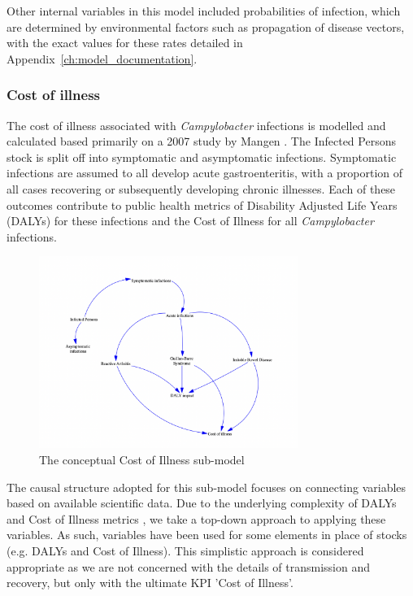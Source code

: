 Other internal variables in this model included probabilities of infection, which are determined by environmental factors such as propagation of disease vectors, with the exact values for these rates detailed in Appendix~\ref{ch:model_documentation}.


\subsubsection*{Cost of illness}

The cost of illness associated with \textit{Campylobacter} infections is modelled and calculated based primarily on a 2007 study by Mangen \parencite{mangen_campylobacteriosis_2007}. The Infected Persons stock is split off into symptomatic and asymptomatic infections. Symptomatic infections are assumed to all develop acute gastroenteritis, with a proportion of all cases recovering or subsequently developing chronic illnesses. Each of these outcomes contribute to public health metrics of Disability Adjusted Life Years (DALYs) for these infections and the Cost of Illness for all \textit{Campylobacter} infections. 

\begin{figure}[h]
\centering
\includegraphics[width=0.75\textwidth]{images/COI_submodel.png}
\caption{The conceptual Cost of Illness sub-model}
\end{figure}

The causal structure adopted for this sub-model focuses on connecting variables based on available scientific data. Due to the underlying complexity of DALYs and Cost of Illness metrics \parencite{jo_cost--illness_2014}, we take a top-down approach to applying these variables. As such, variables have been used for some elements in place of stocks (e.g. DALYs and Cost of Illness). This simplistic approach is considered appropriate as we are not concerned with the details of transmission and recovery, but only with the ultimate KPI 'Cost of Illness'. 

